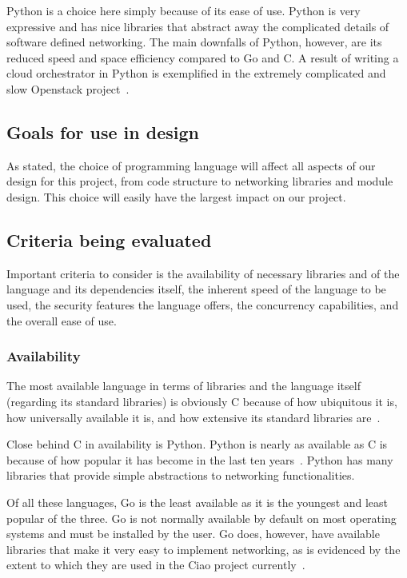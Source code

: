 \documentclass[10pt,letterpaper,onecolumn,draftclsnofoot]{IEEEtran}
\begin{document}
Python is a choice here simply because of its ease of use. Python is very
expressive and has nice libraries that abstract away the complicated details of
software defined networking. The main downfalls of Python, however, are its
reduced speed and space efficiency compared to Go and C. A result of writing a
cloud orchestrator in Python is exemplified in the extremely complicated and
slow Openstack project~\cite{uglyopenstack}.

\subsection{Goals for use in design}

As stated, the choice of programming language will affect all aspects of our
design for this project, from code structure to networking libraries and module
design. This choice will easily have the largest impact on our project.

\subsection{Criteria being evaluated}

Important criteria to consider is the availability of necessary libraries and of
the language and its dependencies itself, the inherent speed of the language to
be used, the security features the language offers, the concurrency
capabilities, and the overall ease of use.

\subsubsection{Availability}

The most available language in terms of libraries and the language itself
(regarding its standard libraries) is obviously C because of how ubiquitous it
is, how universally available it is, and how extensive its standard libraries
are~\cite{SOC}.

Close behind C in availability is Python. Python is nearly as available as C is
because of how popular it has become in the last ten years~\cite{PYPL}. Python
has many libraries that provide simple abstractions to networking
functionalities.

Of all these languages, Go is the least available as it is the youngest and
least popular of the three. Go is not normally available by default on most
operating systems and must be installed by the user. Go does, however, have
available libraries that make it very easy to implement networking, as is
evidenced by the extent to which they are used in the Ciao project
currently~\cite{ciao}.
\end{document}
